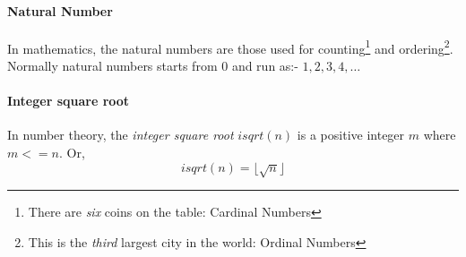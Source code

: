 \paragraph{Natural Number}
In mathematics, the natural numbers are those used for counting\footnote{There are \textit{six} coins on the table: Cardinal Numbers} and ordering\footnote{This is the \textit{third} largest city in the world: Ordinal Numbers}. Normally natural numbers starts from $0$ and run as:- $1, 2, 3, 4,\dots$

\paragraph{Integer square root}
In number theory, the \textit{integer square root} $isqrt(n)$ is a positive integer $m$ where $m <= n$. Or, $$isqrt(n) = \lfloor\sqrt{n}\rfloor$$